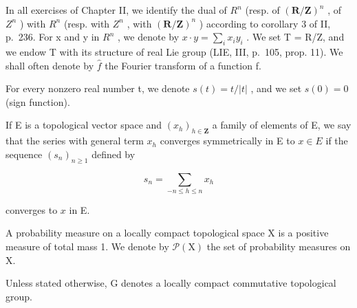 
In all exercises of Chapter II, we identify the dual of \(R^{n}\) (resp. of \((\mathbf{R}/\mathbf{Z})^{n}\) , of \(Z^{n}\) ) with \(R^{n}\) (resp. with \(Z^{n}\) , with \((\mathbf{R}/\mathbf{Z})^{n}\) ) according to corollary 3 of II, p.~236. For x and y in \(R^{n}\) , we denote by \(x \cdot y = \sum_{i} x_{i} y_{i}\) . We set T = R/Z, and we endow T with its structure of real Lie group (LIE, III, p.~105, prop. 11). We shall often denote by \(\widehat{f}\) the Fourier transform of a function f.

For every nonzero real number t, we denote \(s(t) = t/|t|\) , and we set \(s(0) = 0\) (sign function).

If E is a topological vector space and \((x_{h})_{h\in\mathbf{Z}}\) a family of elements of E, we say that the series with general term \(x_{h}\) converges symmetrically in E to \(x\in E\) if the sequence \((s_{n})_{n\geqslant1}\) defined by

\[
s _ {n} = \sum_ {- n \leqslant h \leqslant n} x _ {h}
\]

converges to \(x\) in E.

A probability measure on a locally compact topological space X is a positive measure of total mass 1. We denote by \(\mathcal{P}(\mathrm{X})\) the set of probability measures on X.

Unless stated otherwise, G denotes a locally compact commutative topological group.
